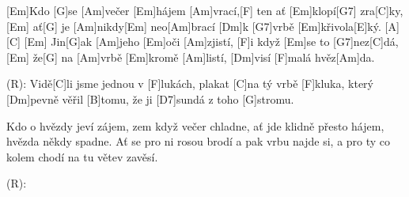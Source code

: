 
[Em]Kdo [G]se [Am]večer [Em]hájem [Am]vrací,[F] ten ať [Em]klopí[G7] zra[C]ky, [Em]
ať[G] je [Am]nikdy[Em] neo[Am]brací [Dm]k [G7]vrbě [Em]křivola[E]ký. [A] [C] [Em]
Jin[G]ak [Am]jeho [Em]oči [Am]zjistí, [F]i když [Em]se to [G7]nez[C]dá, [Em]
že[G] na [Am]vrbě [Em]kromě [Am]listí, [Dm]visí [F]malá hvěz[Am]da.

(R): Vidě[C]li jsme jednou v [F]lukách,
plakat [C]na tý vrbě [F]kluka,
který [Dm]pevně věřil [B]tomu,
že ji [D7]sundá z toho [G]stromu.

Kdo o hvězdy jeví zájem, zem když večer chladne,
ať jde klidně přesto hájem, hvězda někdy spadne.
Ať se pro ni rosou brodí a pak vrbu najde si,
a pro ty co kolem chodí na tu větev zavěsí.

(R):

